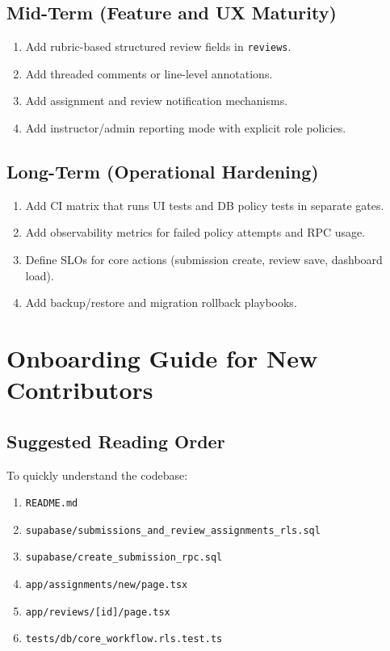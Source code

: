\documentclass[11pt]{article}
\begin{document}
\subsection{Mid-Term (Feature and UX Maturity)}
\begin{enumerate}[leftmargin=*]
  \item Add rubric-based structured review fields in \texttt{reviews}.
  \item Add threaded comments or line-level annotations.
  \item Add assignment and review notification mechanisms.
  \item Add instructor/admin reporting mode with explicit role policies.
\end{enumerate}

\subsection{Long-Term (Operational Hardening)}
\begin{enumerate}[leftmargin=*]
  \item Add CI matrix that runs UI tests and DB policy tests in separate gates.
  \item Add observability metrics for failed policy attempts and RPC usage.
  \item Define SLOs for core actions (submission create, review save, dashboard load).
  \item Add backup/restore and migration rollback playbooks.
\end{enumerate}

\section{Onboarding Guide for New Contributors}
\subsection{Suggested Reading Order}
To quickly understand the codebase:
\begin{enumerate}[leftmargin=*]
  \item \texttt{README.md}
  \item \texttt{supabase/submissions\_and\_review\_assignments\_rls.sql}
  \item \texttt{supabase/create\_submission\_rpc.sql}
  \item \texttt{app/assignments/new/page.tsx}
  \item \texttt{app/reviews/[id]/page.tsx}
  \item \texttt{tests/db/core\_workflow.rls.test.ts}
\end{enumerate}
\end{document}
